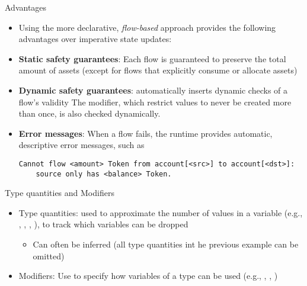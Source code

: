 \documentclass[leqno,presentation,usenames,dvipsnames]{beamer}
\begin{document}
\begin{frame}[fragile]{Advantages}
    \begin{itemize}
        \item Using the more declarative, \emph{flow-based} approach provides the following advantages over imperative state updates:
        \item \textbf{Static safety guarantees}: Each flow is guaranteed to preserve the total amount of assets (except for flows that explicitly consume or allocate assets)
        \item \textbf{Dynamic safety guarantees}: \langName automatically inserts dynamic checks of a flow's validity
            The  modifier, which restrict values to never be created more than once, is also checked dynamically.
        \item \textbf{Error messages}: When a flow fails, the \langName runtime provides automatic, descriptive error messages, such as
\begin{lstlisting}[numbers=none, basicstyle=\footnotesize\ttfamily, xleftmargin=-4.5em]
Cannot flow <amount> Token from account[<src>] to account[<dst>]:
    source only has <balance> Token.
\end{lstlisting}
    \end{itemize}
\end{frame}

\begin{frame}[fragile]{Type quantities and Modifiers}
    \begin{itemize}
        \item Type quantities: used to approximate the number of values in a variable (e.g., , , , ), to track which variables can be dropped
            \begin{itemize}
                \item Can often be inferred (all type quantities int he previous example can be omitted)
            \end{itemize}

        \item Modifiers: Use to specify how variables of a type can be used (e.g., , , )
    \end{itemize}

    
\end{frame}
\end{document}
